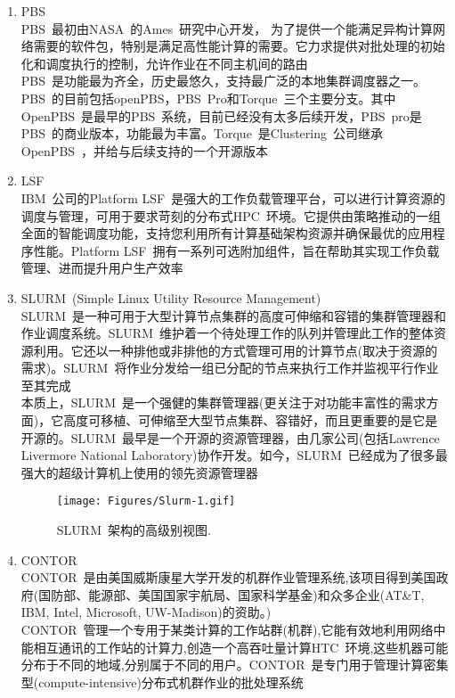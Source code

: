 \documentclass{article}      %
\begin{document}
\begin{enumerate}
	\item PBS~\\
		\textrm{PBS~}最初由\textrm{NASA~}的\textrm{Ames~}研究中心开发， 为了提供一个能满足异构计算网络需要的软件包，特别是满足高性能计算的需要。它力求提供对批处理的初始化和调度执行的控制，允许作业在不同主机间的路由\\
		\textrm{PBS~}是功能最为齐全，历史最悠久，支持最广泛的本地集群调度器之一。\textrm{PBS~}的目前包括\textrm{openPBS}，\textrm{PBS~Pro}和\textrm{Torque~}三个主要分支。其中\textrm{OpenPBS~}是最早的\textrm{PBS~}系统，目前已经没有太多后续开发，\textrm{PBS~pro}是\textrm{PBS~}的商业版本，功能最为丰富。\textrm{Torque~}是\textrm{Clustering~}公司继承\textrm{OpenPBS~}，并给与后续支持的一个开源版本
	\item LSF~\\
		\textrm{IBM~}公司的\textrm{Platform LSF~}是强大的工作负载管理平台，可以进行计算资源的调度与管理，可用于要求苛刻的分布式\textrm{HPC~}环境。它提供由策略推动的一组全面的智能调度功能，支持您利用所有计算基础架构资源并确保最优的应用程序性能。\textrm{Platform LSF~}拥有一系列可选附加组件，旨在帮助其实现工作负载管理、进而提升用户生产效率
	\item \textrm{SLURM~(Simple Linux Utility Resource Management)}\\
		\textrm{SLURM~}是一种可用于大型计算节点集群的高度可伸缩和容错的集群管理器和作业调度系统。\textrm{SLURM~}维护着一个待处理工作的队列并管理此工作的整体资源利用。它还以一种排他或非排他的方式管理可用的计算节点(取决于资源的需求)。\textrm{SLURM~}将作业分发给一组已分配的节点来执行工作并监视平行作业至其完成\\
		本质上，\textrm{SLURM~}是一个强健的集群管理器(更关注于对功能丰富性的需求方面)，它高度可移植、可伸缩至大型节点集群、容错好，而且更重要的是它是开源的。\textrm{SLURM~}最早是一个开源的资源管理器，由几家公司(包括\textrm{Lawrence Livermore National Laboratory})协作开发。如今，\textrm{SLURM~}已经成为了很多最强大的超级计算机上使用的领先资源管理器
\begin{figure}[h!]
\centering
\texttt{[image: Figures/Slurm-1.gif]}
\caption{\small \textrm{SLURM~}架构的高级别视图.}%
\label{Fig:Slurm}
\end{figure}
	\item CONTOR~\\
		\textrm{CONTOR~}是由美国威斯康星大学开发的机群作业管理系统,该项目得到美国政府(国防部、能源部、美国国家宇航局、国家科学基金)和众多企业(\textrm{AT\&T, IBM, Intel, Microsoft, UW-Madison})的资助。)\\
		\textrm{CONTOR~}管理一个专用于某类计算的工作站群(机群),它能有效地利用网络中能相互通讯的工作站的计算力,创造一个高吞吐量计算\textrm{HTC~}环境,这些机器可能分布于不同的地域,分别属于不同的用户。\textrm{CONTOR~}是专门用于管理计算密集型(\textrm{compute-intensive})分布式机群作业的批处理系统
\end{enumerate}
\end{document}
